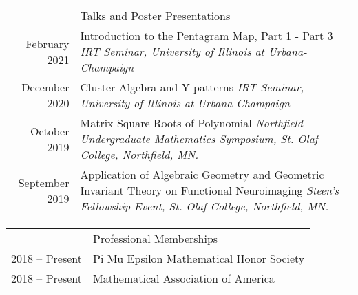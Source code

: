 \documentclass[letterpaper, 11pt]{article}
\newcommand{\headingfont}{\Large\color{Red}}
\newenvironment{SectionTable}[1]{
	\renewcommand*{\arraystretch}{1.7}
	\setlength{\tabcolsep}{10pt}
	\begin{longtable}{Rp{5.2in}} & #1 \\}
	{\end{longtable}\vspace{-.3cm}}
\begin{document}
\begin{SectionTable}{\headingfont Talks and Poster Presentations}
		February 2021 &
		Introduction to the Pentagram Map, Part 1 - Part 3 \newline
		\textit{IRT Seminar, University of Illinois at Urbana-Champaign} \\
		
		December 2020 &
		Cluster Algebra and Y-patterns \newline
		\textit{IRT Seminar, University of Illinois at Urbana-Champaign} \\
		
		
		October 2019 &
		Matrix Square Roots of Polynomial \newline
		\textit{Northfield Undergraduate Mathematics Symposium, St. Olaf College, Northfield, MN.} \\


		September 2019 &
		Application of Algebraic Geometry and Geometric Invariant Theory on Functional Neuroimaging \newline
		\textit{Steen’s Fellowship Event, St. Olaf College, Northfield, MN.} \\	
	\end{SectionTable}
	
	
		
	
	
	\begin{SectionTable}{\headingfont Professional Memberships}
		2018 -- Present & 
		Pi Mu Epsilon Mathematical Honor Society \\
		
		2018 -- Present &
		Mathematical Association of America \\
	\end{SectionTable}
	

	
	
	
	
\end{document}
